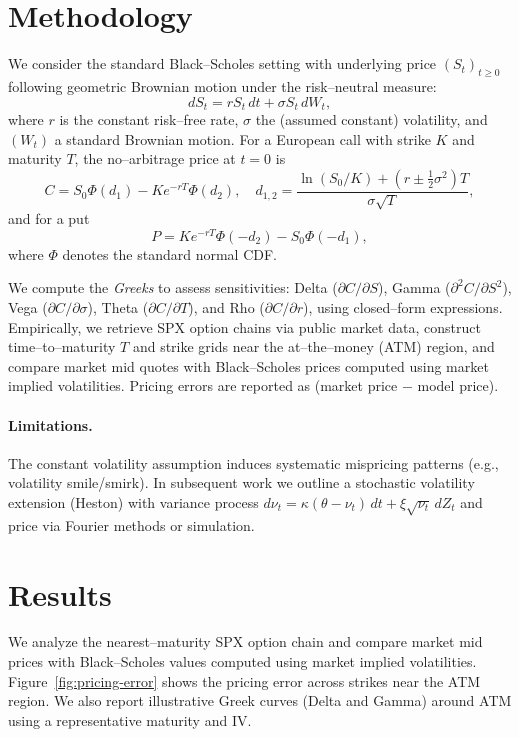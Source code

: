 \documentclass[12pt]{article}
\begin{document}
\section{Methodology}
We consider the standard Black--Scholes setting with underlying price $(S_t)_{t\ge 0}$ following geometric Brownian motion under the
risk--neutral measure:
\begin{equation}
dS_t = r S_t\,dt + \sigma S_t\, dW_t,
\end{equation}
where $r$ is the constant risk--free rate, $\sigma$ the (assumed constant) volatility, and $(W_t)$ a standard Brownian motion.
For a European call with strike $K$ and maturity $T$, the no--arbitrage price at $t=0$ is
\begin{equation}
C = S_0 \Phi(d_1) - K e^{-rT} \Phi(d_2), \quad
d_{1,2} = \frac{\ln(S_0/K) + (r \pm \tfrac{1}{2}\sigma^2)T}{\sigma\sqrt{T}},
\end{equation}
and for a put
\begin{equation}
P = K e^{-rT} \Phi(-d_2) - S_0 \Phi(-d_1),
\end{equation}
where $\Phi$ denotes the standard normal CDF.

We compute the \emph{Greeks} to assess sensitivities: Delta ($\partial C/\partial S$), Gamma ($\partial^2 C/\partial S^2$),
Vega ($\partial C/\partial \sigma$), Theta ($\partial C/\partial T$), and Rho ($\partial C/\partial r$), using closed--form expressions.
Empirically, we retrieve SPX option chains via public market data, construct time--to--maturity $T$ and strike grids near the
at--the--money (ATM) region, and compare market mid quotes with Black--Scholes prices computed using market implied volatilities.
Pricing errors are reported as (market price $-$ model price).

\paragraph{Limitations.}
The constant volatility assumption induces systematic mispricing patterns (e.g., volatility smile/smirk). In subsequent work we outline
a stochastic volatility extension (Heston) with variance process
$d\nu_t = \kappa(\theta-\nu_t)\,dt + \xi \sqrt{\nu_t}\, dZ_t$ and price via Fourier methods or simulation.

\section{Results}
We analyze the nearest--maturity SPX option chain and compare market mid prices with Black--Scholes values computed using market
implied volatilities. Figure~\ref{fig:pricing-error} shows the pricing error across strikes near the ATM region.
We also report illustrative Greek curves (Delta and Gamma) around ATM using a representative maturity and IV.
\end{document}
